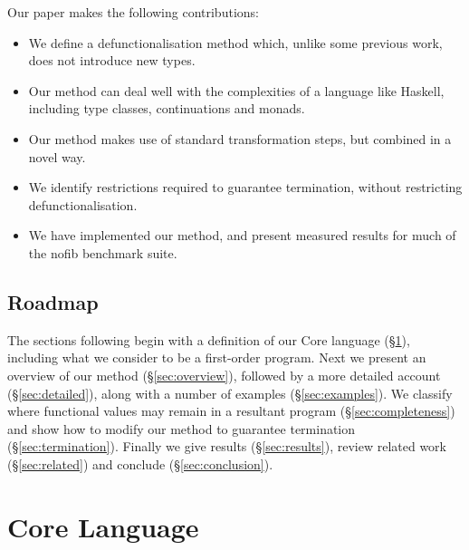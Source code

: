 \documentclass[preprint]{sigplanconf}
\begin{document}
Our paper makes the following contributions:

\begin{itemize}
\item We define a defunctionalisation method which, unlike some previous work, does not introduce new types.
\item Our method can deal well with the complexities of a language like Haskell, including type classes, continuations and monads.
\item Our method makes use of standard transformation steps, but combined in a novel way.
\item We identify restrictions required to guarantee termination, without restricting defunctionalisation.
\item We have implemented our method, and present measured results for much of the nofib benchmark suite.
\end{itemize}

\subsection{Roadmap}

The sections following begin with a definition of our Core language (\S\ref{sec:core}), including what we consider to be a first-order program. Next we present an overview of our method (\S\ref{sec:overview}), followed by a more detailed account (\S\ref{sec:detailed}), along with a number of examples (\S\ref{sec:examples}). We classify where functional values may remain in a resultant program (\S\ref{sec:completeness}) and show how to modify our method to guarantee termination (\S\ref{sec:termination}). Finally we give results (\S\ref{sec:results}), review related work (\S\ref{sec:related}) and conclude (\S\ref{sec:conclusion}).

\section{Core Language}
\label{sec:core}
\end{document}
